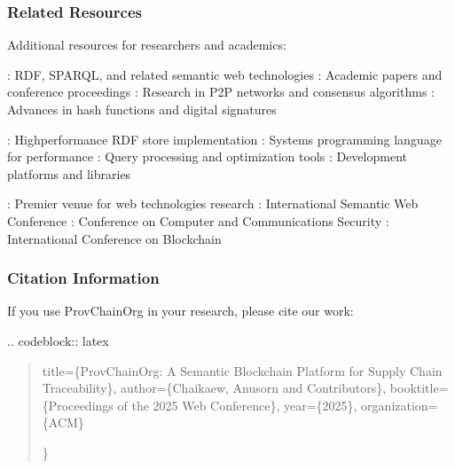 \documentclass[letterpaper,10pt,english]{sphinxmanual}
\begin{document}
\subsubsection{Related Resources}
\label{\detokenize{research/index:related-resources}}
\sphinxAtStartPar
Additional resources for researchers and academics:

\sphinxAtStartPar
{}
\sphinxhyphen{} : RDF, SPARQL, and related semantic web technologies
\sphinxhyphen{} : Academic papers and conference proceedings
\sphinxhyphen{} : Research in P2P networks and consensus algorithms
\sphinxhyphen{} : Advances in hash functions and digital signatures

\sphinxAtStartPar
{}
\sphinxhyphen{} : High\sphinxhyphen{}performance RDF store implementation
\sphinxhyphen{} : Systems programming language for performance
\sphinxhyphen{} : Query processing and optimization tools
\sphinxhyphen{} : Development platforms and libraries

\sphinxAtStartPar
{}
\sphinxhyphen{} : Premier venue for web technologies research
\sphinxhyphen{} : International Semantic Web Conference
\sphinxhyphen{} : Conference on Computer and Communications Security
\sphinxhyphen{} : International Conference on Blockchain


\subsubsection{Citation Information}
\label{\detokenize{research/index:citation-information}}
\sphinxAtStartPar
If you use ProvChainOrg in your research, please cite our work:

\sphinxAtStartPar
{}
.. code\sphinxhyphen{}block:: latex
\begin{quote}
\begin{description}
\sphinxAtStartPar
title=\{ProvChainOrg: A Semantic Blockchain Platform for Supply Chain Traceability\},
author=\{Chaikaew, Anusorn and Contributors\},
booktitle=\{Proceedings of the 2025 Web Conference\},
year=\{2025\},
organization=\{ACM\}

\end{description}

\sphinxAtStartPar
\}
\end{quote}
\end{document}

